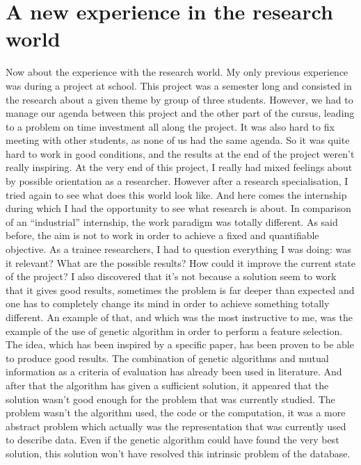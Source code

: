 \documentclass{report}
\begin{document}
	\section{A new experience in the research world}
	
	Now about the experience with the research world. My only previous experience was during a project at school. This project was a semester long and consisted in the research about a given theme by group of three students. However, we had to manage our agenda between this project and the other part of the cursus, leading to a problem on time investment all along the project. It was also hard to fix meeting with other students, as none of us had the same agenda. So it was quite hard to work in good conditions, and the results at the end of the project weren't really inspiring. At the very end of this project, I really had mixed feelings about by possible orientation as a researcher. However after a research specialisation, I tried again to see what does this world look like. And here comes the internship during which I had the opportunity to see what research is about. In comparison of an “industrial” internship, the work paradigm was totally different. As said before, the aim is not to work in order to achieve a fixed and quantifiable objective. As a trainee researchers, I had to question everything I was doing: was it relevant? What are the possible results? How could it improve the current state of the project? I also discovered that it's not because a solution seem to work that it gives good results, sometimes the problem is far deeper than expected and one has to completely change its mind in order to achieve something totally different.
	An example of that, and which was the most instructive to me, was the example of the use of genetic algorithm in order to perform a feature selection. The idea, which has been inspired by a specific paper, has been proven to be able to produce good results. The combination of genetic algorithms and mutual information as a criteria of evaluation has already been used in literature. And after that the algorithm has given a sufficient solution, it appeared that the solution wasn't good enough for the problem that was currently studied. The problem wasn't the algorithm used, the code or the computation, it was a more abstract problem which actually was the representation that was currently used to describe data. Even if the genetic algorithm could have found the very best solution, this solution won't have resolved this intrinsic problem of the database.\\
	
\end{document}
